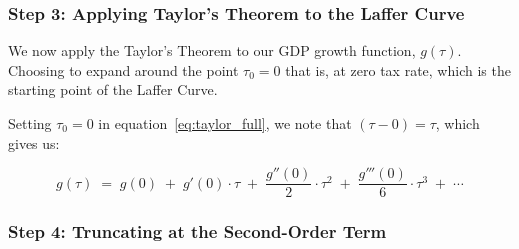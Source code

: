 \documentclass[12pt,a4paper]{report}
\theoremstyle{definition}
\theoremstyle{plain}
\theoremstyle{remark}
\begin{document}
	\subsubsection*{Step 3: Applying Taylor's Theorem to the Laffer Curve}
	
	We now apply the Taylor's Theorem to our GDP growth function, $g(\tau)$.
	Choosing to expand around the point $\tau_0 = 0$ that is, at zero tax rate,
	which is the starting point of the Laffer Curve.
	
	Setting $\tau_0 = 0$ in equation~\eqref{eq:taylor_full}, we note that
	$(\tau - 0) = \tau$, which gives us:
	
	\begin{equation}
		g(\tau) \;=\; g(0)
		\;+\; g'(0)\cdot\tau
		\;+\; \frac{g''(0)}{2}\cdot\tau^2
		\;+\; \frac{g'''(0)}{6}\cdot\tau^3
		\;+\; \cdots
		\label{eq:taylor_at_zero}
	\end{equation}
	
	\subsubsection*{Step 4: Truncating at the Second-Order Term}
	
\end{document}
